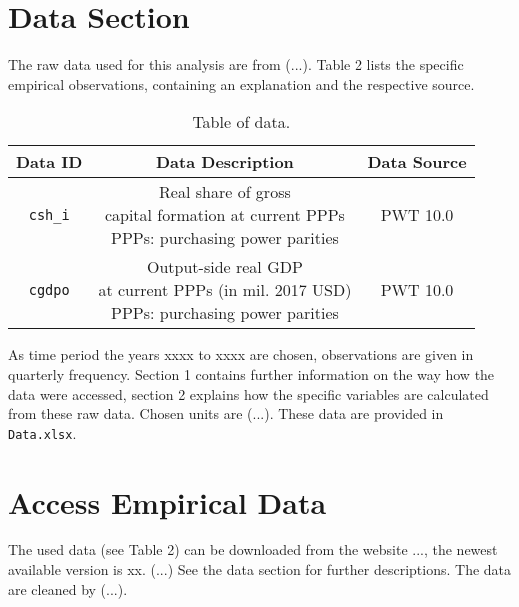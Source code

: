 \documentclass[12pt,a4paper,notitlepage]{article}
\numberwithin{equation}{section}
\begin{document}
\section*{Data Section}
The raw data used for this analysis are from (...). Table 2 lists the specific empirical observations, containing an explanation and the respective source.
\begin{table}[h]
	\begin{center}
		\begin{tabular}{|c|c|c|}
			\hline
			\textbf{Data ID} & \textbf{Data Description} & \textbf{Data Source} \\ \hline
			\texttt{csh\_i} & \makecell{Real share of gross \\capital formation at current PPPs \\ PPPs: purchasing power parities} & PWT 10.0 \\ \hline
			\texttt{cgdpo} & \makecell{Output-side real GDP\\ at current PPPs (in mil. 2017 USD) \\ PPPs: purchasing power parities} & PWT 10.0 \\ \hline
		\end{tabular}  
		\caption{Table of data.}
	\end{center}
\end{table}
As time period the years xxxx to xxxx are chosen, observations are given in quarterly frequency. Section 1 contains further information on the way how the data were accessed, section 2 explains how the specific variables are calculated from these raw data. Chosen units are (...). These data are provided in \texttt{Data.xlsx}.

\newpage

\section{Access Empirical Data}
The used data (see Table 2) can be downloaded from the website ..., the newest available version is xx. (...) See the data section for further descriptions. The data are cleaned by (...).
\end{document}
